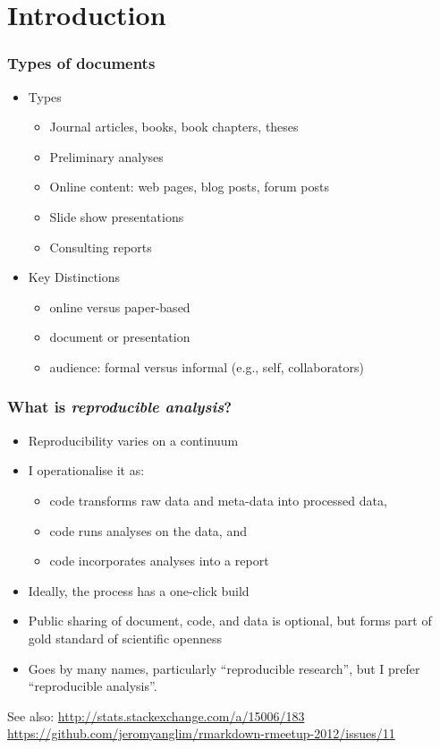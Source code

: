 \section{Introduction}

\begin{frame}\frametitle{Types of documents}

\begin{itemize}
\item
  Types

  \begin{itemize}
  \item
    Journal articles, books, book chapters, theses
  \item
    Preliminary analyses
  \item
    Online content: web pages, blog posts, forum posts
  \item
    Slide show presentations
  \item
    Consulting reports
  \end{itemize}
\item
  Key Distinctions

  \begin{itemize}
  \item
    online versus paper-based
  \item
    document or presentation
  \item
    audience: formal versus informal (e.g., self, collaborators)
  \end{itemize}
\end{itemize}

\end{frame}

\begin{frame}\frametitle{What is \emph{reproducible analysis}?}

\begin{itemize}
\item
  Reproducibility varies on a continuum
\item
  I operationalise it as:

  \begin{itemize}
  \item
    code transforms raw data and meta-data into processed data,
  \item
    code runs analyses on the data, and
  \item
    code incorporates analyses into a report
  \end{itemize}
\item
  Ideally, the process has a one-click build
\item
  Public sharing of document, code, and data is optional, but forms part
  of gold standard of scientific openness
\item
  Goes by many names, particularly ``reproducible research'', but I
  prefer ``reproducible analysis''.
\end{itemize}

\tiny{
See also: \url{http://stats.stackexchange.com/a/15006/183} 
\url{https://github.com/jeromyanglim/rmarkdown-rmeetup-2012/issues/11}}

\end{frame}

